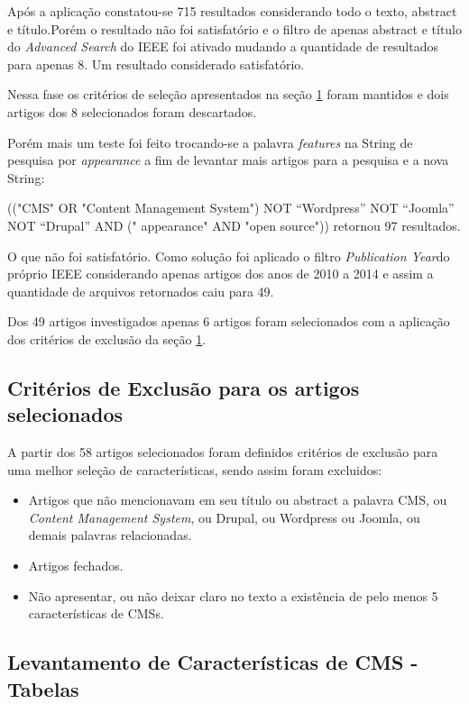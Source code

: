 \begin{apendicesenv}
Após a aplicação constatou-se 715 resultados considerando todo o texto, abstract e título.Porém o resultado não foi satisfatório e o filtro de apenas abstract e título do \textit{Advanced Search } do IEEE foi ativado mudando a quantidade de resultados para apenas 8. Um resultado considerado satisfatório.

Nessa fase os critérios de seleção apresentados na seção \ref{CExclusion} foram mantidos e dois artigos dos 8 selecionados foram descartados.

Porém mais um teste foi feito trocando-se a palavra \textit{features} na String de pesquisa por \textit{appearance} a fim de levantar mais artigos para a pesquisa e a  nova String: 

(("CMS" OR "Content Management System") NOT “Wordpress” NOT “Joomla” NOT “Drupal” AND (" appearance" AND "open source")) retornou 97 resultados.

O que não foi satisfatório. Como solução foi aplicado o filtro \textit{Publication Year}do próprio IEEE considerando apenas artigos dos anos de 2010 a 2014 e assim a quantidade de arquivos retornados caiu para 49.

Dos 49 artigos investigados apenas 6 artigos foram selecionados com a aplicação dos critérios de exclusão da seção \ref{CExclusion}.


\section{Critérios de Exclusão para os artigos selecionados}
\label{CExclusion}

A partir dos 58 artigos selecionados foram definidos critérios de exclusão para uma melhor seleção de características, sendo assim foram excluidos:

\begin{itemize}
\item Artigos que não mencionavam em seu título ou abstract a palavra CMS, ou \textit{Content Management System}, ou Drupal, ou Wordpress ou Joomla, ou demais palavras relacionadas.
\item Artigos fechados.
\item Não apresentar, ou não deixar claro no texto a existência de pelo menos 5 características de CMSs.

\end{itemize}

\begin{landscape}
\chapter{Levantamento de Características de CMS - Tabelas}
\label{Levantamento de características-apendice}


\end{landscape}
\end{apendicesenv}
